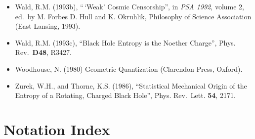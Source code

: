 \documentclass[11pt,a4paper]{article}
\begin{document}
\begin{itemize}
\item
  Wald, R.M. (1993b), ``\,`Weak' Cosmic Censorship'', in \emph{PSA 1992}, volume 2, ed.~by M. Forbes D. Hull and K. Okruhlik, Philosophy of Science Association (East Lansing, 1993).
\item
  Wald, R.M. (1993c), ``Black Hole Entropy is the Noether Charge'', Phys. Rev.~\textbf{D48}, R3427.
\item
  Woodhouse, N. (1980) Geometric Quantization (Clarendon Press, Oxford).
\item
  Zurek, W.H., and Thorne, K.S. (1986), ``Statistical Mechanical Origin of the Entropy of a Rotating, Charged Black Hole'', Phys. Rev.~Lett. \textbf{54}, 2171.
\end{itemize}

\clearpage
\hypertarget{source-213}{}

\hypertarget{source-214}{}
\section*{Notation Index}
\end{document}
